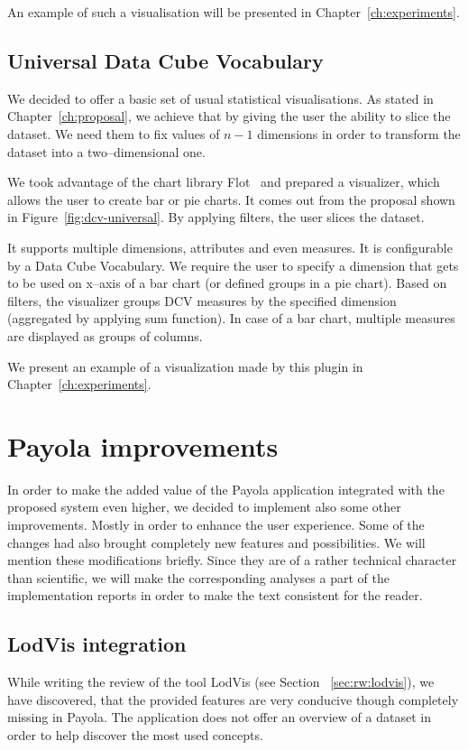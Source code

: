 An example of such a visualisation will be presented in 
Chapter~\ref{ch:experiments}.

\subsection{Universal Data Cube Vocabulary}
We decided to offer a basic set of usual statistical visualisations. As stated 
in Chapter~\ref{ch:proposal}, we achieve that by giving the user the ability to 
slice the dataset. We need them to fix values of $n-1$ dimensions in order to 
transform the dataset into a two--dimensional one.

We took advantage of the chart library Flot~\cite{flot} and prepared a 
visualizer, which allows the user to create bar or pie charts. It 
comes out from the proposal shown in Figure~\ref{fig:dcv-universal}. By 
applying filters, the user slices the dataset.

It supports multiple dimensions, attributes and even measures. It is 
configurable by a Data Cube Vocabulary. We require the user to specify a 
dimension that gets to be used on x--axis of a bar chart (or defined groups in a 
pie chart). Based on filters, the visualizer groups DCV measures by the specified 
dimension (aggregated by applying sum function). In case of a bar chart, multiple measures are 
displayed as groups of columns.

We present an example of a visualization made by this plugin in 
Chapter~\ref{ch:experiments}.

\section{Payola improvements}
In order to make the added value of the Payola application integrated with the 
proposed system even higher, we decided to implement also some other
improvements. Mostly in order to enhance the user experience. Some of the changes
had also brought completely new features and possibilities. We will mention 
these modifications briefly. Since they are of a rather technical character 
than scientific, we will make the corresponding analyses a part of the 
implementation reports in order to make the text consistent for the reader.

\subsection{LodVis integration}
While writing the review of the tool LodVis (see Section ~\ref{sec:rw:lodvis}), 
we have discovered, that the provided features are very conducive though completely 
missing in Payola. The application does not offer an overview of a dataset in order 
to help discover the most used concepts.

